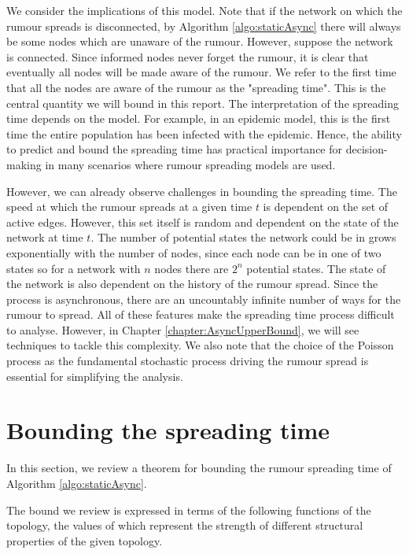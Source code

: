 We consider the implications of this model. 
Note that if the network on which the rumour spreads is disconnected, by Algorithm \ref{algo:staticAsync} there will always be some nodes which are unaware of the rumour. However, suppose the network is connected.
Since informed nodes never forget the rumour, it is clear that eventually all nodes will be made aware of the rumour. We refer to the first time that all the nodes are aware of the rumour as the "spreading time". This is the central quantity we will bound in this report. The interpretation of the spreading time depends on the model. For example, in an epidemic model, this is the first time the entire population has been infected with the epidemic. Hence, the ability to predict and bound the spreading time has practical importance for decision-making in many scenarios where rumour spreading models are used.

However, we can already observe challenges in bounding the spreading time. The speed at which the rumour spreads at a given time $t$ is dependent on the set of active edges. However, this set itself is random and dependent on the state of the network at time $t$. The number of potential states the network could be in grows exponentially with the number of nodes, since each node can be in one of two states so for a network with $n$ nodes there are $2^n$ potential states. The state of the network is also dependent on the history of the rumour spread.
Since the process is asynchronous, there are an uncountably infinite number of ways for the rumour to spread. All of these features make the spreading time process difficult to analyse. However, in Chapter \ref{chapter:AsyncUpperBound}, we will see techniques to tackle this complexity. We also note that the choice of the Poisson process as the fundamental stochastic process driving the rumour spread is essential for simplifying the analysis.

\section{Bounding the spreading time}\label{section:graphMetrics}

In this section, we review a theorem for bounding the rumour spreading time of Algorithm \ref{algo:staticAsync}.

The bound we review is expressed in terms of the following functions of the topology, the values of which represent the strength of different structural properties of the given topology.

